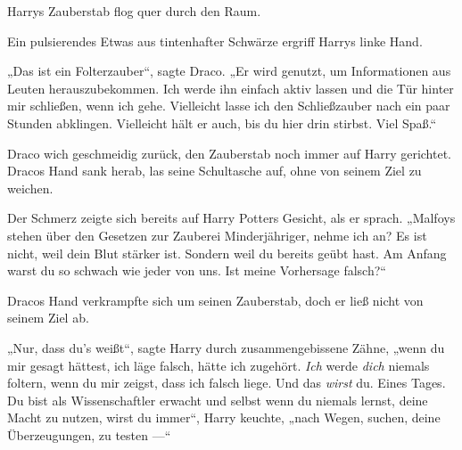 
Harrys Zauberstab flog quer durch den Raum.


Ein pulsierendes Etwas aus tintenhafter Schwärze ergriff Harrys linke Hand.

„Das ist ein Folterzauber“, sagte Draco.
„Er wird genutzt, um Informationen aus Leuten herauszubekommen. Ich werde ihn einfach aktiv lassen und die Tür hinter mir schließen, wenn ich gehe. Vielleicht lasse ich den Schließzauber nach ein paar Stunden abklingen. Vielleicht hält er auch, bis du hier drin stirbst. Viel Spaß.“

Draco wich geschmeidig zurück, den Zauberstab noch immer auf Harry gerichtet. Dracos Hand sank herab, las seine Schultasche auf, ohne von seinem Ziel zu weichen.

Der Schmerz zeigte sich bereits auf Harry Potters Gesicht, als er sprach.
„Malfoys stehen über den Gesetzen zur Zauberei Minderjähriger, nehme ich an? Es ist nicht, weil dein Blut stärker ist. Sondern weil du bereits geübt hast. Am Anfang warst du so schwach wie jeder von uns. Ist meine Vorhersage falsch?“

Dracos Hand verkrampfte sich um seinen Zauberstab, doch er ließ nicht von seinem Ziel ab.

„Nur, dass du’s weißt“, sagte Harry durch zusammengebissene Zähne, „wenn du mir gesagt hättest, ich läge falsch, hätte ich zugehört. \emph{Ich} werde \emph{dich} niemals foltern, wenn du mir zeigst, dass ich falsch liege. Und das \emph{wirst} du. Eines Tages. Du bist als Wissenschaftler erwacht und selbst wenn du niemals lernst, deine Macht zu nutzen, wirst du immer“, Harry keuchte, „nach Wegen, suchen, deine Überzeugungen, zu testen —“

